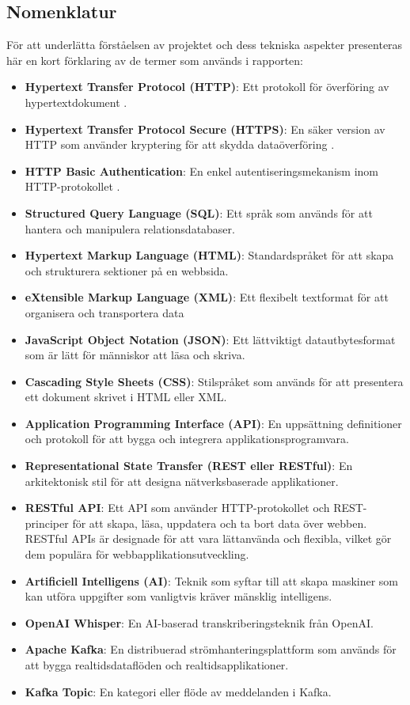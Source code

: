 \subsection{Nomenklatur}
\label{sec:nomenclature}
För att underlätta förståelsen av projektet och dess tekniska aspekter
presenteras här en kort förklaring av de termer som används i rapporten:
\begin{itemize}
    \item \textbf{Hypertext Transfer Protocol (HTTP)}: Ett protokoll för
    överföring av hypertextdokument \cite{RFC7231}.
    \item \textbf{Hypertext Transfer Protocol Secure (HTTPS)}: En säker
    version av HTTP som använder kryptering för att skydda dataöverföring
    \cite{RFC2818}.
    \item \textbf{HTTP Basic Authentication}: En enkel autentiseringsmekanism
    inom HTTP-protokollet \cite{RFC7617}.
    \item \textbf{Structured Query Language (SQL)}: Ett språk som används för
    att hantera och manipulera relationsdatabaser.
    \item \textbf{Hypertext Markup Language (HTML)}: Standardspråket för att
    skapa och strukturera sektioner på en webbsida.
    \item \textbf{eXtensible Markup Language (XML)}: Ett flexibelt textformat
    för att organisera och transportera data
    \item \textbf{JavaScript Object Notation (JSON)}: Ett lättviktigt
    datautbytesformat som är lätt för människor att läsa och skriva.
    \item \textbf{Cascading Style Sheets (CSS)}: Stilspråket som används för
    att presentera ett dokument skrivet i HTML eller XML.
    \item \textbf{Application Programming Interface (API)}: En uppsättning
    definitioner och protokoll för att bygga och integrera
    applikationsprogramvara.
    \item \textbf{Representational State Transfer (REST eller RESTful)}: En
    arkitektonisk stil för att designa nätverksbaserade applikationer.
    \item \textbf{RESTful API}: Ett API som använder HTTP-protokollet och
    REST-principer för att skapa, läsa, uppdatera och ta bort data över
    webben. RESTful APIs är designade för att vara lättanvända och flexibla,
    vilket gör dem populära för webbapplikationsutveckling.
    \item \textbf{Artificiell Intelligens (AI)}: Teknik som syftar till att
    skapa maskiner som kan utföra uppgifter som vanligtvis kräver mänsklig
    intelligens.
    \item \textbf{OpenAI Whisper}: En AI-baserad transkriberingsteknik från
    OpenAI.
    \item \textbf{Apache Kafka}: En distribuerad strömhanteringsplattform som
    används för att bygga realtidsdataflöden och realtidsapplikationer.
    \item \textbf{Kafka Topic}: En kategori eller flöde av meddelanden i
    Kafka.
\end{itemize}

